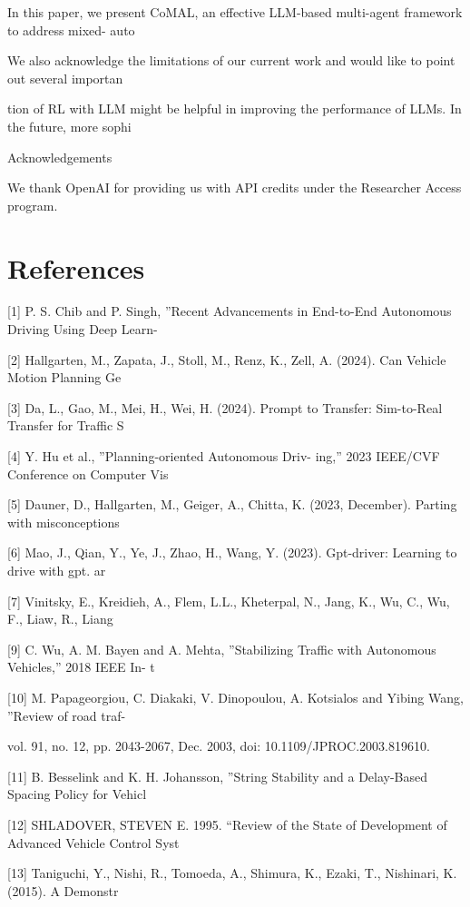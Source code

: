 \documentclass[12pt]{article}
\begin{document}
In this paper, we present CoMAL, an effective
LLM-based multi-agent framework to address mixed-
auto


We also acknowledge the limitations of our current
work and would like to point out several importan


tion of RL with LLM might be helpful in improving
the performance of LLMs. In the future, more sophi


Acknowledgements


We thank OpenAI for providing us with API credits
under the Researcher Access program.


\section{References}


[1] P. S. Chib and P. Singh, ”Recent Advancements in
End-to-End Autonomous Driving Using Deep Learn-


[2] Hallgarten, M., Zapata, J., Stoll, M., Renz, K., Zell,
A. (2024). Can Vehicle Motion Planning Ge


[3] Da, L., Gao, M., Mei, H., Wei, H. (2024). Prompt
to Transfer: Sim-to-Real Transfer for Traffic S


[4] Y. Hu et al., ”Planning-oriented Autonomous Driv-
ing,” 2023 IEEE/CVF Conference on Computer
Vis


[5] Dauner, D., Hallgarten, M., Geiger, A., Chitta, K.
(2023, December). Parting with misconceptions


[6] Mao, J., Qian, Y., Ye, J., Zhao, H., Wang, Y. (2023).
Gpt-driver: Learning to drive with gpt. ar


[7] Vinitsky, E., Kreidieh, A., Flem, L.L., Kheterpal,
N., Jang, K., Wu, C., Wu, F., Liaw, R., Liang


[9] C. Wu, A. M. Bayen and A. Mehta, ”Stabilizing
Traffic with Autonomous Vehicles,” 2018 IEEE In-
t


[10] M. Papageorgiou, C. Diakaki, V. Dinopoulou, A.
Kotsialos and Yibing Wang, ”Review of road traf-


vol. 91, no. 12, pp. 2043-2067, Dec. 2003, doi:
10.1109/JPROC.2003.819610.


[11] B. Besselink and K. H. Johansson, ”String Stability
and a Delay-Based Spacing Policy for Vehicl


[12] SHLADOVER, STEVEN E. 1995. “Review of the State
of Development of Advanced Vehicle Control Syst


[13] Taniguchi, Y., Nishi, R., Tomoeda, A., Shimura, K.,
Ezaki, T., Nishinari, K. (2015). A Demonstr
\end{document}
